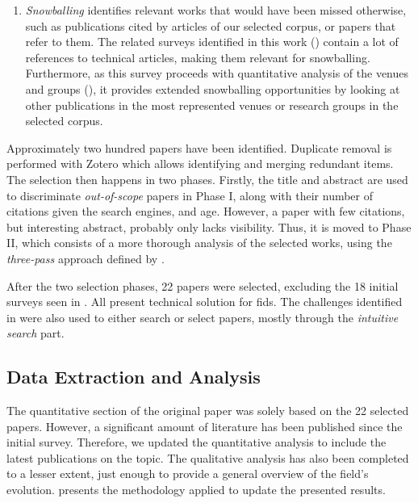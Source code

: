 \begin{enumerate}[(1)]
  \item \emph{Snowballing} identifies relevant works that would have been missed otherwise, such as publications cited by articles of our selected corpus, or papers that refer to them.
  The related surveys identified in this work () contain a lot of references to technical articles, making them relevant for snowballing.
  Furthermore, as this survey proceeds with quantitative analysis of the venues and groups (), it provides extended snowballing opportunities by looking at other publications in the most represented venues or research groups in the selected corpus.

\end{enumerate}

Approximately two hundred papers have been identified.
Duplicate removal is performed with Zotero which allows identifying and merging redundant items.
The selection then happens in two phases.
Firstly, the title and abstract are used to discriminate \emph{out-of-scope} papers in Phase I, along with their number of citations given the search engines, and age.
However, a paper with few citations, but interesting abstract, probably only lacks visibility.
Thus, it is moved to Phase II, which consists of a more thorough analysis of the selected works, using the \emph{three-pass} approach defined by \textcite{keshav_Howreadpaper_2007}.

After the two selection phases, 22 papers were selected, excluding the 18 initial surveys seen in .
All present technical solution for \gls{fids}.
The challenges identified in  were also used to either search or select papers, mostly through the \emph{intuitive search} part.


\subsection{Data Extraction and Analysis\label{sec:sota.methodo.extraction}}

The quantitative section of the original paper was solely based on the 22 selected papers.
However, a significant amount of literature has been published since the initial survey.
Therefore, we updated the quantitative analysis to include the latest publications on the topic.
The qualitative analysis has also been completed to a lesser extent, just enough to provide a general overview of the field's evolution.
 presents the methodology applied to update the presented results.

